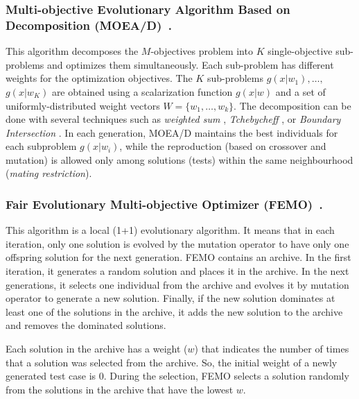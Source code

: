 \subsubsection{Multi-objective Evolutionary Algorithm Based on Decomposition (MOEA/D)~\cite{zhang2007moea}. }
%
This algorithm decomposes the $M$-objectives problem into $K$ single-objective sub-problems and optimizes them simultaneously. 
Each sub-problem has different weights for the optimization objectives. The $K$ sub-problems $g(x|w_1), \dots,$ $g(x|w_K)$ are obtained using a scalarization function $g(x|w)$ and a set of uniformly-distributed weight vectors $W=\{w_1, \dots, w_k\}$. The decomposition can be done  with several techniques such as \textit{weighted sum} \cite{Miettinen1999}, \textit{Tchebycheff} \cite{Miettinen1999}, or \textit{Boundary Intersection} \cite{Indraneel, messac2003normalized}. 
In each generation, MOEA/D maintains the best individuals for each subproblem $g(x|w_i)$, while the reproduction (based on crossover and mutation) is allowed only among solutions (tests) within the same neighbourhood (\textit{mating restriction}).


\subsubsection{Fair Evolutionary Multi-objective Optimizer (FEMO)~\cite{laumanns2002}. } 
%
This algorithm is a local (1+1) evolutionary algorithm. It means that in each iteration, only one solution is evolved by the mutation operator to have only one offspring solution for the next generation.
FEMO contains an archive. In the first iteration, it generates a random solution and places it in the archive. In the next generations, it selects one individual from the archive and evolves it by mutation operator to generate a new solution. Finally, if the new solution dominates at least one of the solutions in the archive, it adds the new solution to the archive and removes the dominated solutions.

Each solution in the archive has a weight ($w$) that indicates the number of times that a solution was selected from the archive. So, the initial weight of a newly generated test case is $0$. During the selection, FEMO selects a solution randomly from the solutions in the archive that have the lowest $w$.
